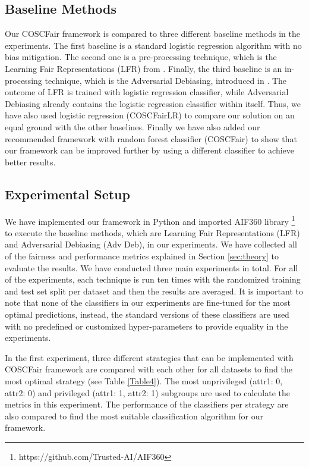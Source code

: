 \subsection{Baseline Methods}\label{ssec:baselines}

Our COSCFair framework is compared to three different baseline methods in the experiments. The first baseline is a standard logistic regression algorithm with no bias mitigation. The second one is a pre-processing technique, which is the Learning Fair Representations (LFR) from \cite{zemel2013fair_learning}. Finally, the third baseline is an in-processing technique, which is the Adversarial Debiasing, introduced in \cite{zhang2018adversarial}. The outcome of LFR is trained with logistic regression classifier, while Adversarial Debiasing already contains the logistic regression classifier within itself. Thus, we have also used logistic regression (COSCFairLR) to compare our solution on an equal ground with the other baselines. Finally we have also added our recommended framework with random forest classifier (COSCFair) to show that our framework can be improved further by using a different classifier to achieve better results.







\subsection{Experimental Setup}\label{sscec:expers}

We have implemented our framework in Python and imported AIF360 library \footnote{https://github.com/Trusted-AI/AIF360} to execute the baseline methods, which are Learning Fair Representations (LFR) and Adversarial Debiasing (Adv Deb), in our experiments. We have collected all of the fairness and performance metrics explained in Section \ref{sec:theory} to evaluate the results. We have conducted three main experiments in total. For all of the experiments, each technique is run ten times with the randomized training and test set split per dataset and then the results are averaged. It is important to note that none of the classifiers in our experiments are fine-tuned for the most optimal predictions, instead, the standard versions of these classifiers are used with no predefined or customized hyper-parameters to provide equality in the experiments.


In the first experiment, three different strategies that can be implemented with COSCFair framework are compared with each other for all datasets to find the most optimal strategy (see Table \ref{Table4}). The most unprivileged (attr1: 0, attr2: 0) and privileged (attr1: 1, attr2: 1) subgroups are used to calculate the metrics in this experiment. The performance of the classifiers per strategy are also compared to find the most suitable classification algorithm for our framework. 


